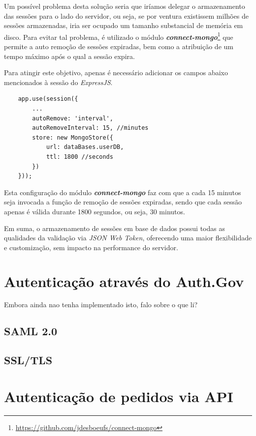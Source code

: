 Um possível problema desta solução seria que iríamos delegar o armazenamento das sessões para o lado do servidor, ou seja, se por ventura existissem milhões de sessões armazenadas, iria ser ocupado um tamanho substancial de memória em disco. Para evitar tal problema, é utilizado o módulo \emph{\textbf{connect-mongo}}\footnote{\url{https://github.com/jdesboeufs/connect-mongo}} que permite a auto remoção de sessões expiradas, bem como a atribuição de um tempo máximo após o qual a sessão expira.

Para atingir este objetivo, apenas é necessário adicionar os campos abaixo mencionados à sessão do \emph{ExpressJS}.

\begin{verbatim}
    app.use(session({
        ...
        autoRemove: 'interval',
        autoRemoveInterval: 15, //minutes
        store: new MongoStore({
            url: dataBases.userDB,
            ttl: 1800 //seconds
        })
    }));
\end{verbatim}

Esta configuração do módulo \emph{\textbf{connect-mongo}} faz com que a cada 15 minutos seja invocada a função de remoção de sessões expiradas, sendo que cada sessão apenas é válida durante 1800 segundos, ou seja, 30 minutos.

Em suma, o armazenamento de sessões em base de dados possui todas as qualidades da validação via \emph{JSON Web Token}, oferecendo uma maior flexibilidade e customização, sem impacto na performance do servidor.

\cleardoublepage
\section{Autenticação através do Auth.Gov}

Embora ainda nao tenha implementado isto, falo sobre o que li?

\subsection{SAML 2.0}
\subsection{SSL/TLS}

\cleardoublepage
\section{Autenticação de pedidos via API}

